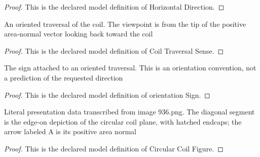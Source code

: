\begin{proof}
  This is the declared model definition of Horizontal Direction.
\end{proof}
\begin{definition}
  \label{def:physics:phyx-mini-0936:phyxminiproblems-problemphyxmini0936-coiltraversalsense}
  An oriented traversal of the coil. The viewpoint is from the tip of the positive area-normal vector looking back toward the coil
\end{definition}
\begin{proof}
  This is the declared model definition of Coil Traversal Sense.
\end{proof}
\begin{definition}
  \label{def:physics:phyx-mini-0936:phyxminiproblems-problemphyxmini0936-coiltraversalsense-orientationsign}
  The sign attached to an oriented traversal. This is an orientation convention, not a prediction of the requested direction
\end{definition}
\begin{proof}
  This is the declared model definition of orientation Sign.
\end{proof}
\begin{definition}
  \label{def:physics:phyx-mini-0936:phyxminiproblems-problemphyxmini0936-circularcoilfigure}
  Literal presentation data transcribed from image 936.png. The diagonal segment is the edge-on depiction of the circular coil plane, with hatched endcaps; the arrow labeled A is its positive area normal
\end{definition}
\begin{proof}
  This is the declared model definition of Circular Coil Figure.
\end{proof}
